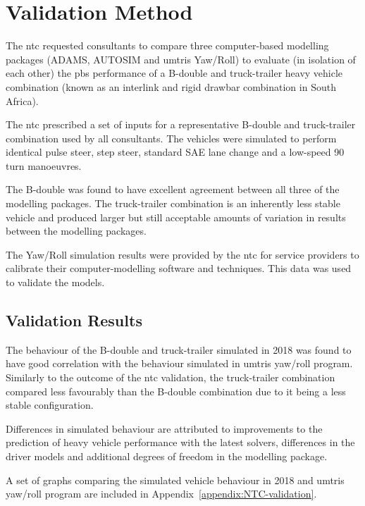 \section{Validation Method}\label{section:validation-method}

The \gls{ntc} requested consultants to compare three computer-based modelling packages (ADAMS, AUTOSIM and \glspl{umtri} Yaw/Roll) to evaluate (in isolation of each other) the \gls{pbs} performance of a B-double and truck-trailer heavy vehicle combination \cite{Prem2001} (known as an interlink and rigid drawbar combination in South Africa).

The \gls{ntc} prescribed a set of inputs for a representative B-double and truck-trailer combination used by all consultants. The vehicles were simulated to perform identical pulse steer, step steer, standard SAE lane change and a low-speed 90\degree{} turn manoeuvres.

The B-double was found to have excellent agreement between all three of the modelling packages. The truck-trailer combination is an inherently less stable vehicle and produced larger but still acceptable amounts of variation in results between the modelling packages.

The Yaw/Roll simulation results were provided by the \gls{ntc} for service providers to calibrate their computer-modelling software and techniques. This data was used to validate the models.

\subsection{Validation Results}\label{section:validation-results}

The behaviour of the B-double and truck-trailer simulated in \trucksim{} 2018 was found to have good correlation with the behaviour simulated in \glspl{umtri} yaw/roll program. Similarly to the outcome of the \gls{ntc} validation, the truck-trailer combination compared less favourably than the B-double combination due to it being a less stable configuration.

Differences in simulated behaviour are attributed to improvements to the prediction of heavy vehicle performance with the latest solvers, differences in the driver models and additional degrees of freedom in the \trucksim{} modelling package.

A set of graphs comparing the simulated vehicle behaviour in \trucksim{} 2018 and \glspl{umtri} yaw/roll program are included in Appendix~\ref{appendix:NTC-validation}.